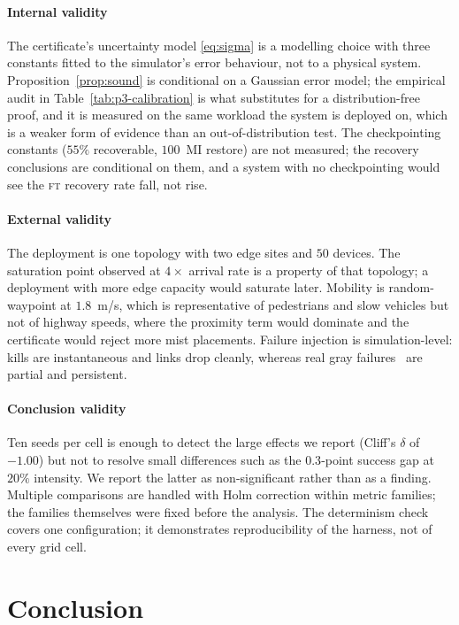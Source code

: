 \documentclass[journal,10pt]{IEEEtran}
\begin{document}
\paragraph{Internal validity}
The certificate's uncertainty model \eqref{eq:sigma} is a modelling choice with
three constants fitted to the simulator's error behaviour, not to a physical
system. Proposition~\ref{prop:sound} is conditional on a Gaussian error model;
the empirical audit in Table~\ref{tab:p3-calibration} is what substitutes for a
distribution-free proof, and it is measured on the same workload the system is
deployed on, which is a weaker form of evidence than an out-of-distribution
test. The checkpointing constants ($55\%$ recoverable, $100$~MI restore) are not
measured; the recovery conclusions are conditional on them, and a system with
no checkpointing would see the \textsc{ft} recovery rate fall, not rise.

\paragraph{External validity}
The deployment is one topology with two edge sites and $50$ devices. The
saturation point observed at $4\times$ arrival rate is a property of that
topology; a deployment with more edge capacity would saturate later. Mobility
is random-waypoint at $1.8$~m/s, which is representative of pedestrians and
slow vehicles but not of highway speeds, where the proximity term would dominate
and the certificate would reject more mist placements. Failure injection is
simulation-level: kills are instantaneous and links drop cleanly, whereas real
gray failures~\cite{huang2017gray} are partial and persistent.

\paragraph{Conclusion validity}
Ten seeds per cell is enough to detect the large effects we report (Cliff's
$\delta$ of $-1.00$) but not to resolve small differences such as the
$0.3$-point success gap at $20\%$ intensity. We report the latter as
non-significant rather than as a finding. Multiple comparisons are handled with
Holm correction within metric families; the families themselves were fixed
before the analysis. The determinism check covers one configuration; it
demonstrates reproducibility of the harness, not of every grid cell.

\section{Conclusion}
\label{sec:concl}
\end{document}
